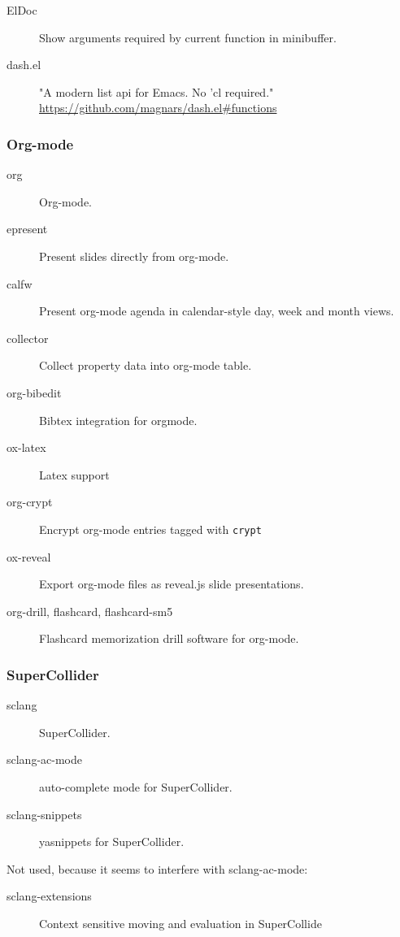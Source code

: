 \documentclass{article}
\begin{document}
\begin{description}
\item[{ElDoc}] Show arguments required by current function in minibuffer.
\item[{dash.el}] "A modern list api for Emacs. No 'cl required."
\url{https://github.com/magnars/dash.el#functions}
\end{description}

\subsubsection{Org-mode}
\label{sec-1-2-2}

\begin{description}
\item[{org}] Org-mode.
\item[{epresent}] Present slides directly from org-mode.
\item[{calfw}] Present org-mode agenda in calendar-style day, week and month views.
\item[{collector}] Collect property data into org-mode table.
\item[{org-bibedit}] Bibtex integration for orgmode.
\item[{ox-latex}] Latex support
\item[{org-crypt}] Encrypt org-mode entries tagged with \texttt{crypt}
\item[{ox-reveal}] Export org-mode files as reveal.js slide presentations.
\item[{org-drill, flashcard, flashcard-sm5}] Flashcard memorization drill software for org-mode.
\end{description}

\subsubsection{SuperCollider}
\label{sec-1-2-3}

\begin{description}
\item[{sclang}] SuperCollider.
\item[{sclang-ac-mode}] auto-complete mode for SuperCollider.
\item[{sclang-snippets}] yasnippets for SuperCollider.
\end{description}

Not used, because it seems to interfere with sclang-ac-mode:

\begin{description}
\item[{sclang-extensions}] Context sensitive moving and evaluation in SuperCollide
\end{description}
\end{document}
